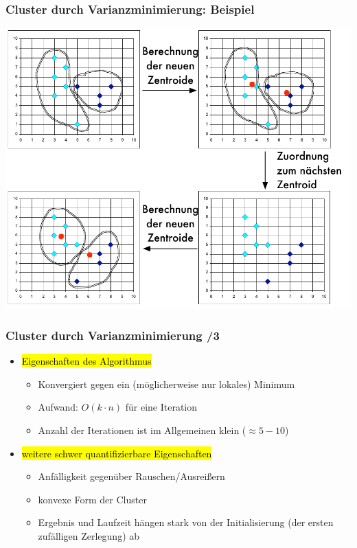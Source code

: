 \begin{frame}
\frametitle{Cluster durch  Varianzminimierung: Beispiel}

\begin{center}
\includegraphics[scale=.5]{fig7/zentroiden-varianz.pdf}
\end{center}


\end{frame}


\begin{frame}
\frametitle{Cluster durch  Varianzminimierung /3}

\begin{itemize}
\item \hl{Eigenschaften des Algorithmus}
\begin{itemize}
\item Konvergiert gegen ein (möglicherweise nur lokales) Minimum 
\item Aufwand: $O(k \cdot n)$ für eine Iteration 
\item Anzahl der Iterationen ist im Allgemeinen klein ($\approx 5 -
  10$) 
\end{itemize}
\item \hl{weitere schwer quantifizierbare Eigenschaften}
\begin{itemize}
\item Anfälligkeit gegenüber Rauschen/Ausreißern 
\item konvexe Form der Cluster 
\item Ergebnis und Laufzeit hängen stark von der Initialisierung (der
  ersten zufälligen Zerlegung) ab  
\end{itemize}
\end{itemize}

\end{frame}

